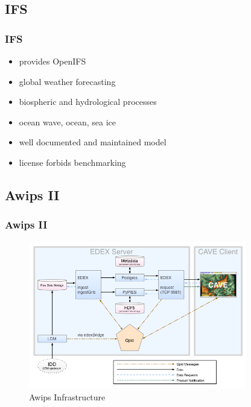 \documentclass[compress]{beamer}
\begin{document}
\subsection{IFS}
\begin{frame}
	\frametitle{IFS}
	\begin{itemize}
	    \item provides OpenIFS \cite{ifs}
	    \item global weather forecasting
	    \item biospheric and hydrological processes
	    \item ocean wave, ocean, sea ice
		\item well documented and maintained model
		\item license forbids benchmarking
	\end{itemize}
\end{frame}

\subsection{Awips II}
\begin{frame}
    \frametitle{Awips II}
    \begin{center}
    	\begin{figure}
			\includegraphics[width=0.85\textwidth]{gfx/awipsII.png}
      	  	\caption[]{Awips Infrastructure \cite{Uni01}}
		\end{figure}
	\end{center}
\end{frame}
\end{document}
